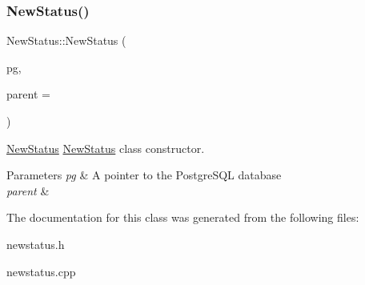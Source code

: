 \subsubsection{\texorpdfstring{New\+Status()}{NewStatus()}}
{\footnotesize\ttfamily New\+Status\+::\+New\+Status (\begin{DoxyParamCaption}\item[{\hyperlink{classpsql}{psql} $\ast$}]{pg,  }\item[{Q\+Widget $\ast$}]{parent = {} }\end{DoxyParamCaption})\hspace{0.3cm}{\ttfamily [explicit]}}



\hyperlink{class_new_status}{New\+Status} \hyperlink{class_new_status}{New\+Status} class constructor. 


\begin{DoxyParams}{Parameters}
{\em pg} & A pointer to the Postgre\+S\+QL database \\
\hline
{\em parent} & \\
\hline
\end{DoxyParams}


The documentation for this class was generated from the following files\+:\begin{DoxyCompactItemize}
\item 
newstatus.\+h\item 
newstatus.\+cpp\end{DoxyCompactItemize}
